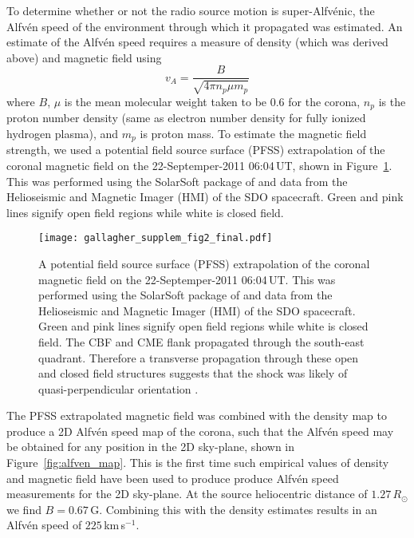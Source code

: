 To determine whether or not the radio source motion is super-Alfv\'{e}nic, the Alfv\'{e}n speed of the environment through which it propagated was estimated. An estimate of the Alfv\'{e}n speed requires a measure of density (which was derived above) and magnetic field using 
\begin{equation}
v_A = \frac{B}{\sqrt{4\pi n_p \mu m_p}}
\end{equation}
where $B$, $\mu$ is the mean molecular weight taken to be 0.6 for the corona, $n_p$ is the proton number density (same as electron number density for fully ionized hydrogen plasma), and $m_p$ is proton mass. To estimate the magnetic field strength, we used a potential field source surface (PFSS) extrapolation of the coronal magnetic field on the 22-Septemper-2011 06:04\,UT, shown in Figure~\ref{fig:pfss}. 
This was performed using the SolarSoft package of \citet{schrijver2003} and data from the Helioseismic and Magnetic Imager (HMI)\citep{scherrer2012} of the SDO spacecraft. Green and pink lines signify open field regions while white is closed field.
%
%
\begin{figure}[ht!]
	\begin{center}
		\texttt{[image: gallagher\_supplem\_fig2\_final.pdf]}
		\caption[A potential field source surface extrapolation of the corona magnetic field]{A potential field source surface (PFSS) 	extrapolation of the coronal magnetic field on the 22-Septemper-2011 06:04\,UT. This was performed using the SolarSoft package of \citet{schrijver2003} and data from the Helioseismic and Magnetic Imager (HMI)\citep{scherrer2012} of the SDO spacecraft. Green and pink lines signify open field regions while white is closed field. The CBF and CME flank propagated through the south-east quadrant. Therefore a transverse propagation through these open and closed field structures suggests that the shock was likely of quasi-perpendicular orientation \citep{carley2013}.}
		\label{fig:pfss}
	\end{center}
\end{figure}
%
%
The PFSS extrapolated magnetic field was combined with the density map to produce a 2D Alfv\'{e}n speed map of the corona, such that the Alfv\'{e}n speed may be obtained for any position in the 2D sky-plane, shown in Figure~\ref{fig:alfven_map}. This is the first time such empirical values of density and magnetic field have been used to produce produce Alfv\'{e}n speed measurements for the 2D sky-plane. 
At the source heliocentric distance of $1.27\,R_{\odot}$ we find $B=0.67$\,G. Combining this with the density estimates results in an Alfv\'{e}n speed of $225$\,km\,s$^{-1}$. 
